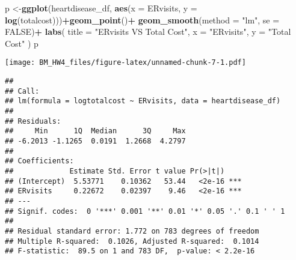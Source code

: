 \documentclass[]{article}
\newenvironment{Shaded}{\begin{snugshade}}{\end{snugshade}}
\newcommand{\KeywordTok}[1]{\textcolor[rgb]{0.13,0.29,0.53}{\textbf{#1}}}
\newcommand{\DataTypeTok}[1]{\textcolor[rgb]{0.13,0.29,0.53}{#1}}
\newcommand{\StringTok}[1]{\textcolor[rgb]{0.31,0.60,0.02}{#1}}
\newcommand{\OtherTok}[1]{\textcolor[rgb]{0.56,0.35,0.01}{#1}}
\newcommand{\OperatorTok}[1]{\textcolor[rgb]{0.81,0.36,0.00}{\textbf{#1}}}
\newcommand{\NormalTok}[1]{#1}
\begin{document}
\begin{Shaded}
\begin{Highlighting}[]
\NormalTok{p <-}\KeywordTok{ggplot}\NormalTok{(heartdisease_df, }\KeywordTok{aes}\NormalTok{(}\DataTypeTok{x =}\NormalTok{ ERvisits, }\DataTypeTok{y =} \KeywordTok{log}\NormalTok{(totalcost)))}\OperatorTok{+}\KeywordTok{geom_point}\NormalTok{()}\OperatorTok{+}
\StringTok{  }\KeywordTok{geom_smooth}\NormalTok{(}\DataTypeTok{method =} \StringTok{"lm"}\NormalTok{, }\DataTypeTok{se =} \OtherTok{FALSE}\NormalTok{)}\OperatorTok{+}
\StringTok{  }\KeywordTok{labs}\NormalTok{(}
    \DataTypeTok{title =} \StringTok{"ERvisits VS Total Cost"}\NormalTok{,}
    \DataTypeTok{x =} \StringTok{"ERvisits"}\NormalTok{,}
    \DataTypeTok{y =} \StringTok{"Total Cost"}
\NormalTok{  )}
\NormalTok{p}
\end{Highlighting}
\end{Shaded}

\texttt{[image: BM\_HW4\_files/figure-latex/unnamed-chunk-7-1.pdf]}

\begin{Shaded}
\end{Shaded}

\begin{verbatim}
## 
## Call:
## lm(formula = logtotalcost ~ ERvisits, data = heartdisease_df)
## 
## Residuals:
##     Min      1Q  Median      3Q     Max 
## -6.2013 -1.1265  0.0191  1.2668  4.2797 
## 
## Coefficients:
##             Estimate Std. Error t value Pr(>|t|)    
## (Intercept)  5.53771    0.10362   53.44   <2e-16 ***
## ERvisits     0.22672    0.02397    9.46   <2e-16 ***
## ---
## Signif. codes:  0 '***' 0.001 '**' 0.01 '*' 0.05 '.' 0.1 ' ' 1
## 
## Residual standard error: 1.772 on 783 degrees of freedom
## Multiple R-squared:  0.1026, Adjusted R-squared:  0.1014 
## F-statistic:  89.5 on 1 and 783 DF,  p-value: < 2.2e-16
\end{verbatim}
\end{document}
